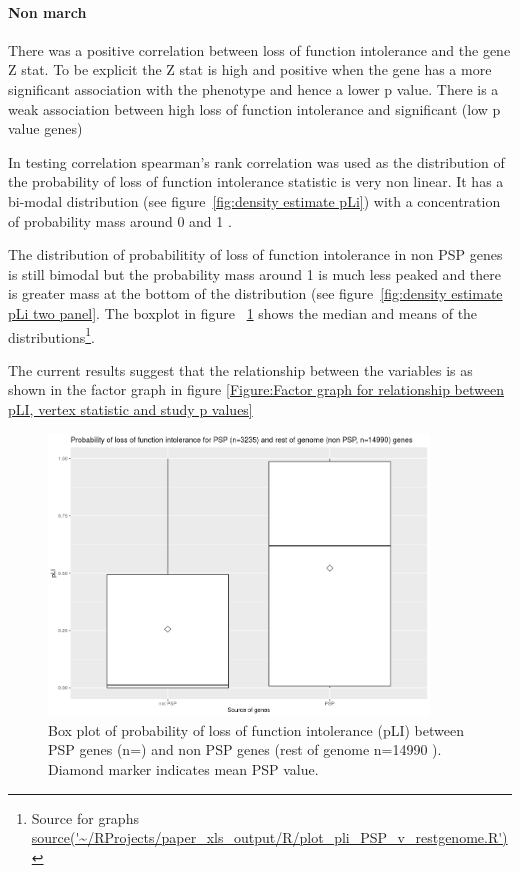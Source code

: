 \paragraph{Non march}
There was a positive correlation between loss of function intolerance and the gene Z stat. To be explicit the Z stat is high and positive when the gene has a more significant association with the phenotype and hence a lower p value. There is a weak association between high loss of function intolerance and significant (low p value genes)

 In testing correlation spearman’s rank correlation was used as the distribution of the probability of loss of function intolerance statistic is very non linear. It has a bi-modal distribution (see figure~\ref{fig:density estimate pLi}) with a concentration of probability mass around 0 and 1 .


The distribution of probabilitity of loss of function intolerance in non PSP genes is still bimodal but the probability mass around 1 is much less peaked and there is greater mass at the bottom of the distribution (see figure~\ref{fig:density estimate pLi two panel}. The boxplot in figure ~\ref{fig:Boxplot of pli} shows the median and means of the distributions\footnote{ Source for graphs \url{source('~/RProjects/paper_xls_output/R/plot_pli_PSP_v_restgenome.R')}}. 








The current results suggest that the relationship between the variables is as shown in the factor graph in figure \ref{Figure:Factor graph for relationship between pLI, vertex statistic and study p values}

\begin{figure}
    \centering
    \includegraphics[width=0.9\textwidth]{images/Rplot03_boxplot_pLI_PSP_non_PSP.png}
    \caption{Box plot of probability of loss of function intolerance (pLI) between PSP genes (n=) and non PSP genes (rest of genome n=14990 ). Diamond marker indicates mean PSP value. }
    \label{fig:Boxplot of pli}
\end{figure}

